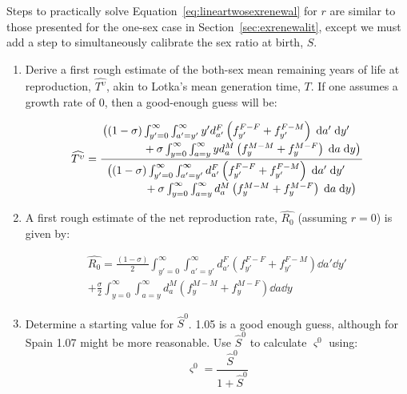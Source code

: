  \FloatBarrier
\label{sec:exrenewalit2}
Steps to practically solve Equation~\eqref{eq:lineartwosexrenewal} for $r$ are
similar to those presented for the one-sex case in
Section~\ref{sec:exrenewalit}, except we must add a step to simultaneously
calibrate the sex ratio at birth, $S$.
\begin{enumerate}
  \item Derive a first rough estimate of the both-sex mean remaining years of
  life at reproduction, $\widehat{T^\upsilon}$, akin to Lotka's mean generation time,
  $T$. If one assumes a growth rate of $0$, then a good-enough guess will be:

\begin{equation}
\label{eq:Tguess}
\widehat{T^\upsilon} = \frac{\splitfrac{
   \big((1 - \sigma)  \int _{y'=0}^\infty \int_{a'=y'}^\infty 
       y' d_{a'}^F \left( f_{y'}^{F-F} + f_{y'}^{F-M} \right) \dd a'\dd y'}{ + 
   \sigma \int_{y=0}^\infty \int _{a=y}^\infty y d_{a}^M  \left( f_{y}^{M-M}+
   f_{y}^{M-F} \right) \dd a \dd y \big)}}{\splitfrac{\big( (1 - \sigma) 
   \int_{y'=0}^\infty \int_{a'=y'}^\infty d_{a'}^F \left( f_{y'}^{F-F} +
   f_{y'}^{F-M} \right) \dd a'\dd y'}{ +\sigma \int _{y=0}^\infty
   \int_{a=y}^\infty d_{a}^M \left( f_{y}^{M-M} + f_{y}^{M-F} \right) \dd a \dd
   y \big)}}
\end{equation}

  \item A first rough estimate of the net reproduction rate, $\widehat{R_0}$ (assuming
  $r=0$) is given by:

 \begin{equation}
 \begin{split}
 \widehat{R_0} = \frac{(1 - \sigma)}{2}  \int _{y'=0}^\infty \int_{a'=y'}^\infty 
                d_{a'}^F \left(f_{y'}^{F-F} + f_{y'}^{F-M}\right) \dd a'\dd y'
                \\ + \frac{\sigma}{2}  \int _{y=0}^\infty \int _{a=y}^\infty 
               d_{a}^M  \left(f_{y}^{M-M}+ f_{y}^{M-F}\right) \dd a \dd y
 \end{split}
 \end{equation}
 \item Determine a starting value for $\hat{S}^0$. 1.05 is a good enough guess,
although for Spain 1.07 might be more reasonable. Use $\hat{S}^0$ to calculate
$\varsigma^0$ using:
\begin{equation}
\label{eq:getvarsigmal}
\varsigma^0 = \frac{\hat{S}^0}{1+\hat{S}^0}
\end{equation}
 

\end{enumerate}
